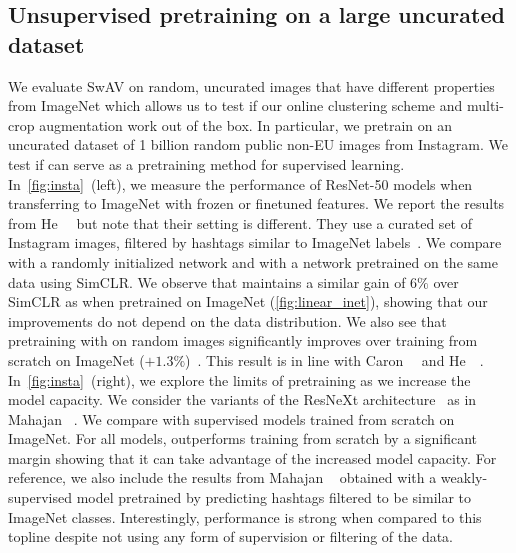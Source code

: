 \subsection{Unsupervised pretraining on a large uncurated dataset}
\label{sec:uncurated}
We evaluate SwAV on random, uncurated images that have different properties from ImageNet which allows us to test if our online clustering scheme and multi-crop augmentation work out of the box.
In particular, we pretrain \OURS on an uncurated dataset of 1 billion random public non-EU images from Instagram.
We test if \OURS can serve as a pretraining method for supervised learning.
In~\cref{fig:insta}~(left), we measure the performance of ResNet-50 models when transferring to ImageNet with frozen or finetuned features.
We report the results from He~\etal~\cite{he2019momentum} but note that their setting is different.
They use a curated set of Instagram images, filtered by hashtags similar to ImageNet labels~\cite{mahajan2018exploring}.
We compare \OURS with a randomly initialized network and with a network pretrained on the same data using SimCLR.
We observe that \OURS maintains a similar gain of $6\%$ over SimCLR as when pretrained on ImageNet (\cref{fig:linear_inet}), showing that our improvements do not depend on the data distribution.
We also see that pretraining with \OURS on random images significantly improves over training from scratch on ImageNet ($+1.3\%$)~\cite{caron2019unsupervised,he2019momentum}.
This result is in line with Caron~\etal~\cite{caron2019unsupervised} and He~\etal~\cite{he2019momentum}.
In~\cref{fig:insta}~(right), we explore the limits of pretraining as we increase the model capacity.
We consider the variants of the ResNeXt architecture~\cite{xie2017aggregated} as in Mahajan \etal~\cite{mahajan2018exploring}.
We compare \OURS with supervised models trained from scratch on ImageNet.
For all models, \OURS outperforms training from scratch by a significant margin showing that it can take advantage of the increased model capacity.
For reference, we also include the results from Mahajan \etal~\cite{mahajan2018exploring} obtained with a weakly-supervised model pretrained by predicting hashtags filtered to be similar to ImageNet classes.
Interestingly, \OURS performance is strong when compared to this topline despite not using any form of supervision or filtering of the data. 

